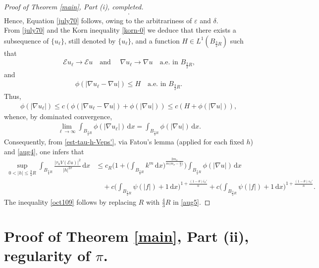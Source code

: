 \documentclass[leqno,11pt]{amsart}%
\numberwithin{equation}{section}
\def\d{\mathrm{d}}
\def\E{\mathcal{E}}
\def\dx{\d x}
\theoremstyle{definition}
\numberwithin{equation}{section}
\begin{document}
\begin{proof}[Proof of Theorem \ref{main}, Part (i), completed]
{\begin{align}
{     }.
\end{align}
Hence, Equation \eqref{july70} follows, owing to the arbitrariness of $\varepsilon$ and $\delta$.}
\\ From \eqref{july70} and the Korn inequality \eqref{korn-0} we deduce that there exists a subsequence of $\{u_\ell\}$, still denoted by $\{u_\ell\}$, and a function $H\in L^1(B_{\frac{3}{2}R})$
such that
\begin{align}
    \label{aug1}
    \E u_\ell \to \E u \quad \text{and }\quad \nabla u_\ell \to \nabla u \quad \text{a.e. in $B_{\frac{3}{2}R}$,}
\end{align}
and 
\begin{align}
    \label{aug1'}
    \phi(|\nabla u_\ell-\nabla u|) \leq H \quad \text{a.e. in $B_{\frac{3}{2}R}$.}
\end{align}
Thus,
\begin{align}
    \label{aug3}
    \phi(|\nabla u_\ell|) \leq c( \phi(|\nabla u_\ell- \nabla u|) + \phi(|\nabla u|) ) \leq    c( H + \phi(|\nabla u|)),
\end{align}
whence, by dominated convergence,
\begin{align}
    \label{aug4}
    \lim_{\ell\to \infty}\int_{B_{\frac{3}{2}R}}\phi(|\nabla u_\ell|) \, \d x = \int_{B_{\frac{3}{2}R}}\phi(|\nabla u|) \, \d x.
\end{align}
Consequently, from \eqref{est-tau-h-Veps'}, via Fatou's lemma (applied for each fixed $h$) and \eqref{aug4}, one infers that
\begin{align}\label{aug5}
\sup_{0<|h|\leq \frac 34R}\int_{B_{ {\frac 34R}}}\frac{|\tau_hV(\E u)|^2}{|h|^{2\sigma}}\,\dx
     & \le {c_R}
    \bigg(1+
       \bigg(\int_{B_{ \frac 32 R}}{k}^{{m}}\,\dx\bigg)^{{\frac{2m_\sigma}{{m(m_\sigma}-\frac{n}{\beta})}}}  \bigg)  \int_{B_{\frac{3}{2}R}}\phi(|\nabla u|)\,\dx\\\nonumber 
      &\quad+
   c
{\bigg(\int_{B_{\frac32 R}}\psi(|f|)+1\,\dx\bigg)^{1+\frac{({1-\theta}) i_\phi'}{n}}
+c\bigg(\int_{B_{\frac 32R}}\psi(|f|)+1\,\dx\bigg)^{1+\frac{({1-\theta}) s_\phi'}{n}}
       }.
   \end{align}
 The inequality \eqref{oct109} follows by    replacing $R$ with $\frac 43R$ in \eqref{aug5}.  
 \end{proof}


\section{Proof of Theorem \ref{main}, Part (ii),  regularity of $\pi$.}\label{sec:proof3}
\end{document}
